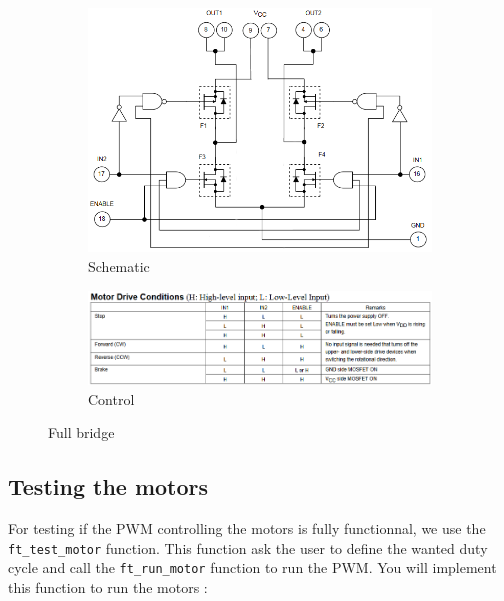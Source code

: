\begin{figure}[!ht]
 \centering
 \begin{subfigure}[b]{.7\textwidth}
  \includegraphics[width=\textwidth]{images/robot_schema}
  \caption{Schematic}
 \end{subfigure}

 \begin{subfigure}[b]{.7\textwidth}
  \includegraphics[width=\textwidth]{images/table_full_bridg}
  \caption{Control}
 \end{subfigure}
 \caption{Full bridge}
 \label{fig:schema_robot}
\end{figure}

\pagebreak
\subsection{Testing the motors}

For testing if the PWM controlling the motors is fully functionnal, we use the \texttt{ft_test_motor} function.
This function ask the user to define the wanted duty cycle and call the \texttt{ft_run_motor} function to run the PWM. You will implement this function to run the motors :

